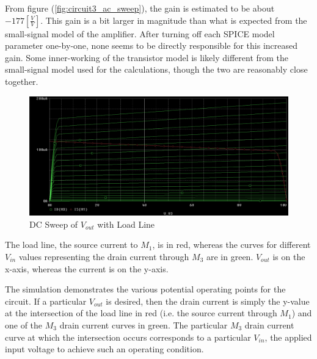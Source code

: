 \FloatBarrier

From figure (\ref{fig:circuit3_ac_sweep}), the gain is estimated to be about $-177[\frac{V}{V}]$. This gain is a bit larger in magnitude than what is expected from the small-signal model of the amplifier. After turning off each SPICE model parameter one-by-one, none seems to be directly responsible for this increased gain. Some inner-working of the transistor model is likely different from the small-signal model used for the calculations, though the two are reasonably close together.

\FloatBarrier

\begin{figure}[h!]
	\centering
	\includegraphics[scale=0.50]{./images/circuit4_dc_sweep_vout.PNG}
	\caption{DC Sweep of $V_{out}$ with Load Line}
	\label{fig:circuit4_dc_sweep_vout}
\end{figure}

\FloatBarrier

{\footnotesize The load line, the source current to $M_1$, is in red, whereas the curves for different $V_{in}$ values representing the drain current through $M_3$ are in green. $V_{out}$ is on the x-axis, whereas the current is on the y-axis.}

\FloatBarrier

The simulation demonstrates the various potential operating points for the circuit. If a particular $V_{out}$ is desired, then the drain current is simply the y-value at the intersection of the load line in red (i.e. the source current through $M_1$) and one of the $M_3$ drain current curves in green. The particular $M_3$ drain current curve at which the intersection occurs corresponds to a particular $V_{in}$, the applied input voltage to achieve such an operating condition.

